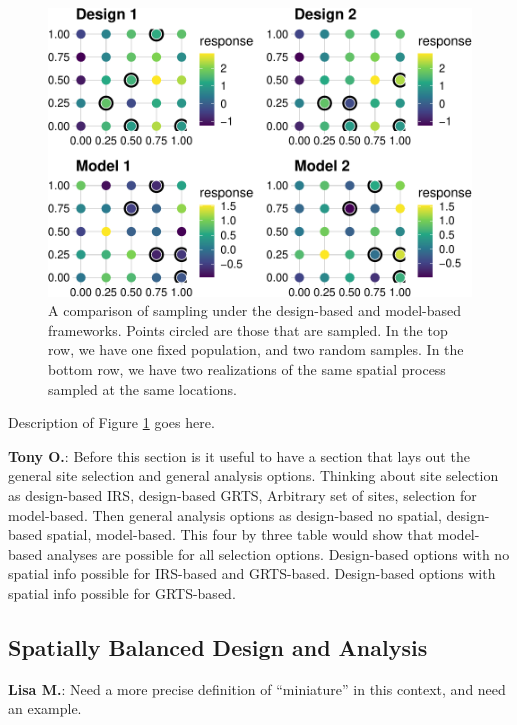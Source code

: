 \documentclass[]{elsarticle} %
\begin{document}
\begin{figure}
\includegraphics[width=1\linewidth]{SpatialDVM_Manuscript_files/figure-latex/fig1-1} \caption{A comparison of sampling under the design-based and model-based frameworks. Points circled are those that are sampled. In the top row, we have one fixed population, and two random samples. In the bottom row, we have two realizations of the same spatial process sampled at the same locations.}\label{fig:fig1}
\end{figure}

Description of Figure \ref{fig:fig1} goes here.

\textbf{Tony O.}: Before this section is it useful to have a section
that lays out the general site selection and general analysis options.
Thinking about site selection as design-based IRS, design-based GRTS,
Arbitrary set of sites, selection for model-based. Then general analysis
options as design-based no spatial, design-based spatial, model-based.
This four by three table would show that model-based analyses are
possible for all selection options. Design-based options with no spatial
info possible for IRS-based and GRTS-based. Design-based options with
spatial info possible for GRTS-based.

\hypertarget{spatially-balanced-design-and-analysis}{%
\subsection{Spatially Balanced Design and
Analysis}\label{spatially-balanced-design-and-analysis}}

\textbf{Lisa M.}: Need a more precise definition of ``miniature'' in
this context, and need an example.
\end{document}
